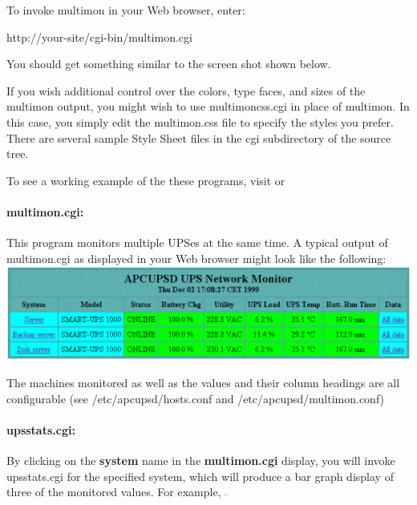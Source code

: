 {{{{{{{{To invoke multimon in your Web browser, enter:  

http://\lt{}your-site\gt{}/cgi-bin/multimon.cgi  

You should get something similar to the screen shot shown below.  

If you wish additional control over the colors, type faces, and sizes of the
multimon output, you might wish to use multimoncss.cgi in place of multimon.
In this case, you simply edit the multimon.css file to specify the styles you
prefer.  There are several sample Style Sheet files in the cgi subdirectory of
the source tree.  

To see a working example of the these programs, visit 
 or 

\label{multimon_005fcgi}

\paragraph*{multimon.cgi:}

\label{index-multimon-126}
\label{index-CGI_002c-multimon-127}
This program monitors multiple UPSes at the same time. A typical output of
multimon.cgi as displayed in your Web browser might look like the following: 
\includegraphics{./multimon.eps}  

The machines monitored as well as the values and their column headings are all
configurable (see /etc/apcupsd/hosts.conf and /etc/apcupsd/multimon.conf) 

\label{upsstats_005fcgi}

\paragraph*{upsstats.cgi:}

\label{index-upsstats-128}
\label{index-CGI_002c-upsstats-129}
By clicking on the {\bf system} name in the {\bf multimon.cgi} display, you
will invoke upsstats.cgi for the specified system, which will produce a bar
graph display of three of the monitored values. For example, 
\includegraphics{./status.eps}  

}}}}}}}}
